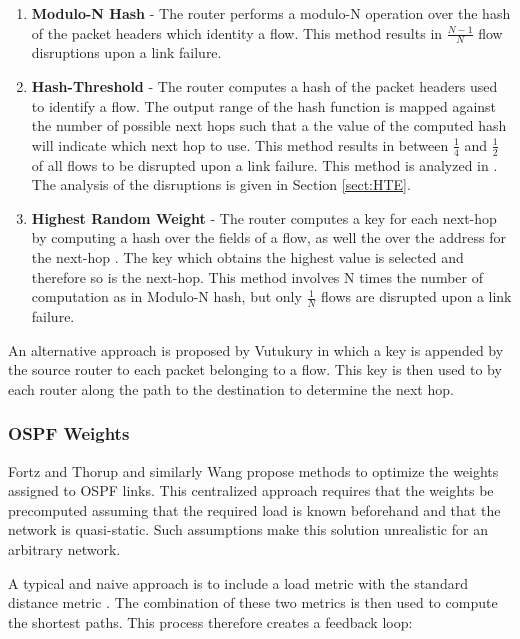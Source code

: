 \begin{enumerate}
 \item \textbf{Modulo-N Hash} - The router performs a modulo-N operation over the hash of the packet headers which identity a flow. This method results in $\frac{N-1}{N}$ flow disruptions upon a link failure.
 \item \textbf{Hash-Threshold} - The router computes a hash of the packet headers used to identify a flow. The output range of the hash function is mapped against the number of possible next hops such that a the value of the computed hash will indicate which next hop to use. This method results in between $\frac{1}{4}$ and $\frac{1}{2}$ of all flows to be disrupted upon a link failure. This method is analyzed in \cite{RFC2992}. The analysis of the disruptions is given in Section \ref{sect:HTE}.
 \item \textbf{Highest Random Weight} - The router computes a key for each next-hop by computing a hash over the fields of a flow, as well the over the address for the next-hop \cite{HRW}. The key which obtains the highest value is selected and therefore so is the next-hop. This method involves N times the number of computation as in Modulo-N hash, but only $\frac{1}{N}$ flows are disrupted upon a link failure.
\end{enumerate}


An alternative approach is proposed by Vutukury \cite{TraffEngMinDelay} in which a key is appended by the source router to each packet belonging to a flow. This key is then used to by each router along the path to the destination to determine the next hop.

\subsubsection{OSPF Weights}

Fortz and Thorup \cite{TrafficEngOSPFWeights} and similarly Wang \cite{WANG01} propose methods to optimize the weights assigned to OSPF links. This centralized approach requires that the weights be precomputed assuming that the required load is known beforehand and that the network is quasi-static. Such assumptions make this solution unrealistic for an arbitrary network.

A typical and naive approach is to include a load metric with the standard distance metric \cite{Huitema}. The combination of these two metrics is then used to compute the shortest paths. This process therefore creates a feedback loop:

